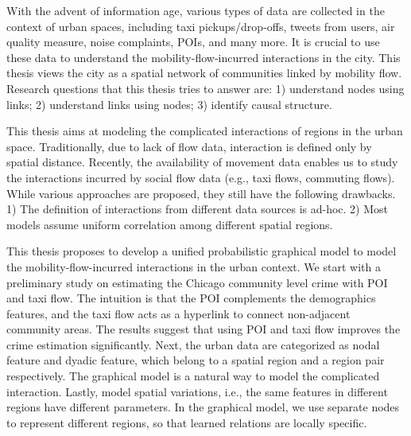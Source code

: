 With the advent of information age, various types of data are collected in the context of urban spaces, including taxi pickups/drop-offs, tweets from users, air quality measure, noise complaints, POIs, and many more. It is crucial to use these data to understand the mobility-flow-incurred interactions in the city. This thesis views the city as a spatial network of communities linked by mobility flow. Research questions that this thesis tries to answer are: 1) understand nodes using links; 2) understand links using nodes; 3) identify causal structure.

This thesis aims at modeling the complicated interactions of regions in the urban space. Traditionally, due to lack of flow data, interaction is defined only by spatial distance. Recently, the availability of movement data enables us to study the interactions incurred by social flow data (e.g., taxi flows, commuting flows).  While various approaches are proposed, they still have the following drawbacks. 1) The definition of interactions from different data sources is ad-hoc. 2) Most models assume uniform correlation among different spatial regions.
 
This thesis proposes to develop a unified probabilistic graphical model to model the mobility-flow-incurred interactions in the urban context. We start with a preliminary study on estimating the Chicago community level crime with POI and taxi flow. The intuition is that the POI complements the demographics features, and the taxi flow acts as a hyperlink to connect non-adjacent community areas. The results suggest that using POI and taxi flow improves the crime estimation significantly. Next, the urban data are categorized as nodal feature and dyadic feature, which belong to a spatial region and a region pair respectively. The graphical model is a natural way to model the complicated interaction.
Lastly, model spatial variations, i.e., the same features in different regions have different parameters. In the graphical model, we use separate nodes to represent different regions, so that learned relations are locally specific.





